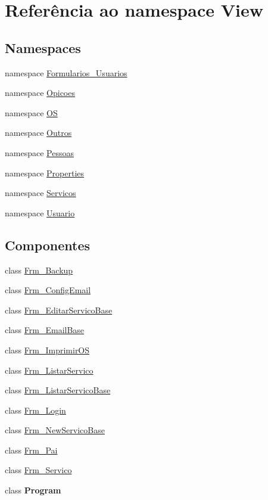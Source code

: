 \hypertarget{namespace_view}{}\section{Referência ao namespace View}
\label{namespace_view}
\subsection*{Namespaces}
\begin{DoxyCompactItemize}
\item 
namespace \hyperlink{namespace_view_1_1_formularios___usuarios}{Formularios\+\_\+\+Usuarios}
\item 
namespace \hyperlink{namespace_view_1_1_opicoes}{Opicoes}
\item 
namespace \hyperlink{namespace_view_1_1_o_s}{O\+S}
\item 
namespace \hyperlink{namespace_view_1_1_outros}{Outros}
\item 
namespace \hyperlink{namespace_view_1_1_pessoas}{Pessoas}
\item 
namespace \hyperlink{namespace_view_1_1_properties}{Properties}
\item 
namespace \hyperlink{namespace_view_1_1_servicos}{Servicos}
\item 
namespace \hyperlink{namespace_view_1_1_usuario}{Usuario}
\end{DoxyCompactItemize}
\subsection*{Componentes}
\begin{DoxyCompactItemize}
\item 
class \hyperlink{class_view_1_1_frm___backup}{Frm\+\_\+\+Backup}
\item 
class \hyperlink{class_view_1_1_frm___config_email}{Frm\+\_\+\+Config\+Email}
\item 
class \hyperlink{class_view_1_1_frm___editar_servico_base}{Frm\+\_\+\+Editar\+Servico\+Base}
\item 
class \hyperlink{class_view_1_1_frm___email_base}{Frm\+\_\+\+Email\+Base}
\item 
class \hyperlink{class_view_1_1_frm___imprimir_o_s}{Frm\+\_\+\+Imprimir\+O\+S}
\item 
class \hyperlink{class_view_1_1_frm___listar_servico}{Frm\+\_\+\+Listar\+Servico}
\item 
class \hyperlink{class_view_1_1_frm___listar_servico_base}{Frm\+\_\+\+Listar\+Servico\+Base}
\item 
class \hyperlink{class_view_1_1_frm___login}{Frm\+\_\+\+Login}
\item 
class \hyperlink{class_view_1_1_frm___new_servico_base}{Frm\+\_\+\+New\+Servico\+Base}
\item 
class \hyperlink{class_view_1_1_frm___pai}{Frm\+\_\+\+Pai}
\item 
class \hyperlink{class_view_1_1_frm___servico}{Frm\+\_\+\+Servico}
\item 
class {\bfseries Program}
\end{DoxyCompactItemize}
